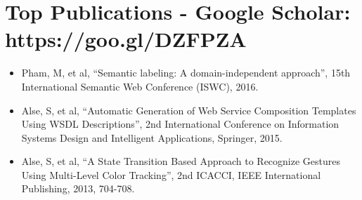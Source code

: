 \newcommand\textlcsc[1]{\textsc{\MakeTextLowercase{#1}}}
\section{Top Publications - \normalsize{Google Scholar: }\textup{https://goo.gl/DZFPZA}}
\begin{itemize}
\setlength\itemsep{-5pt}
\item Pham, M, et al, ``Semantic labeling: A domain-independent approach'', 15th International Semantic Web Conference (ISWC), 2016.
\item Alse, S, et al, ``Automatic Generation of Web Service Composition Templates Using WSDL Descriptions'', 2nd International Conference on Information Systems Design and Intelligent Applications, Springer, 2015.
\item Alse, S, et al, ``A State Transition Based Approach to Recognize Gestures Using Multi-Level Color Tracking'', 2nd ICACCI, IEEE International Publishing, 2013, 704-708.
\end{itemize}
